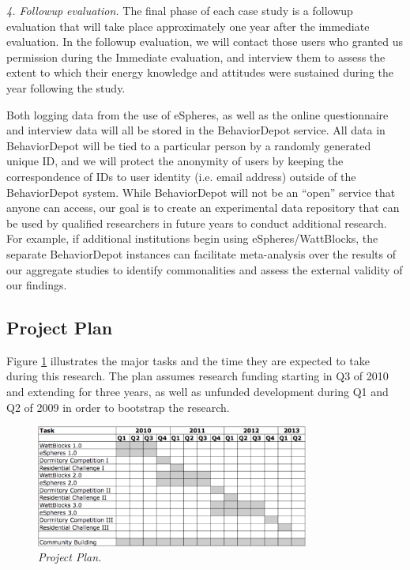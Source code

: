 {\em 4. Followup evaluation.}  The final phase of each case study
is a followup evaluation that will take place approximately one year after
the immediate evaluation.   In the followup evaluation, we will contact
those users who granted us permission during the Immediate evaluation, and
interview them to assess the extent to which their energy knowledge and
attitudes were sustained during the year following the study. 

Both logging data from the use of eSpheres, as well as the online
questionnaire and interview data will all be stored in the BehaviorDepot
service.  All data in BehaviorDepot will be tied to a particular person by
a randomly generated unique ID, and we will protect the anonymity of users
by keeping the correspondence of IDs to user identity (i.e. email address)
outside of the BehaviorDepot system.  While BehaviorDepot will not be an
``open'' service that anyone can access, our goal is to create an
experimental data repository that can be used by qualified researchers in
future years to conduct additional research.  For example, if additional
institutions begin using eSpheres/WattBlocks, the separate BehaviorDepot
instances can facilitate meta-analysis over the results of our aggregate
studies to identify commonalities and assess the external validity of our
findings.


\subsection{Project Plan}
\label{sec:plan}

Figure \ref{fig:plan} illustrates the major tasks and the time they are
expected to take during this research.  The plan assumes research funding
starting in Q3 of 2010 and extending for three years, as well as unfunded
development during Q1 and Q2 of 2009 in order to bootstrap the
research.

\begin{figure}[th]
  \center
  \includegraphics[width=0.8\textwidth]{gantt.eps}
  \caption{\em \small Project Plan.}
 \label{fig:plan}
\end{figure} 

